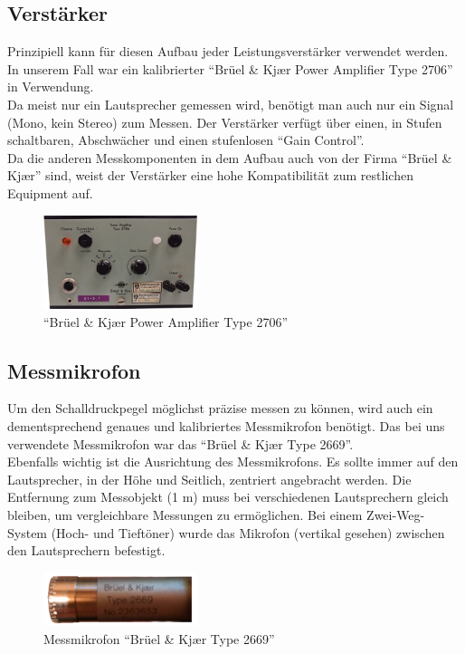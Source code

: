\newpage
\subsection*{Verstärker}\label{subsec:4.1.3}
Prinzipiell kann für diesen Aufbau jeder Leistungsverstärker verwendet werden.
In unserem Fall war ein kalibrierter \enquote{Brüel \& Kj\ae r Power Amplifier Type 2706} in Verwendung.
\\
Da meist nur ein Lautsprecher gemessen wird, benötigt man auch nur ein Signal (Mono, kein Stereo) zum Messen.
Der Verstärker verfügt über einen, in Stufen schaltbaren, Abschwächer und einen stufenlosen \enquote{Gain Control}.\\
Da die anderen Messkomponenten in dem Aufbau auch von der Firma  \enquote{Brüel \& Kj\ae r} sind, weist der Verstärker eine hohe Kompatibilität zum restlichen Equipment auf.
\begin{figure} [H]
	\centering
	\includegraphics[width=0.4\textwidth]{img/LSMessung/verstaerker1V2.png}
	\caption{\enquote{Brüel \& Kj\ae r Power Amplifier Type 2706}}
	\label{fig:4.1.3.1}
\end{figure}

\subsection*{Messmikrofon}\label{subsec:4.1.4}
Um den Schalldruckpegel möglichst präzise messen zu können, wird auch ein dementsprechend genaues und kalibriertes Messmikrofon benötigt.
Das bei uns verwendete Messmikrofon war das \enquote{Brüel \& Kj\ae r Type 2669}.
\\
Ebenfalls wichtig ist die Ausrichtung des Messmikrofons.
Es sollte immer auf den Lautsprecher, in der Höhe und Seitlich, zentriert angebracht werden.
Die Entfernung zum Messobjekt (1 m) muss bei verschiedenen Lautsprechern gleich bleiben, um vergleichbare Messungen zu ermöglichen.
Bei einem Zwei-Weg-System (Hoch- und Tieftöner) wurde das Mikrofon (vertikal gesehen) zwischen den Lautsprechern befestigt.
\begin{figure} [H]
	\centering
	\includegraphics[width=0.4\textwidth]{img/LSMessung/mikroV2.png}
	\caption{Messmikrofon \enquote{Brüel \& Kj\ae r Type 2669}}
	\label{fig:4.1.4.1}
\end{figure}